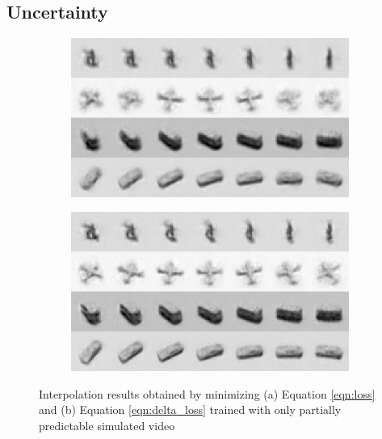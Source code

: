 \subsection{Uncertainty}
\begin{figure}
  \centering
   \begin{subfigure}[b]{0.45\textwidth}
        \includegraphics[width=\textwidth]{./figures/linear/taco/interp_nodelta.png}
        \caption{}
        \label{fig:noDelta}
    \end{subfigure} 
  \begin{subfigure}[b]{0.45\textwidth}
        \includegraphics[width=\textwidth]{./figures/linear/taco/interp_delta.png}
        \caption{}
    \end{subfigure} 
    \label{fig:withDelta}
  \caption{Interpolation results obtained by minimizing (a) Equation \ref{eqn:loss} and (b) Equation \ref{eqn:delta_loss} trained with only partially predictable simulated video} 
  \label{fig:delta}
\end{figure} 
